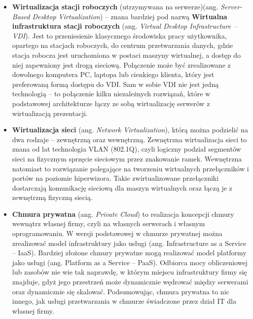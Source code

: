 \begin{itemize}
	\item \textbf{Wirtualizacja stacji roboczych} (utrzymywana na serwerze)(ang. \textit{Server-Based Desktop Virtualization}) – znana bardziej pod nazwą \textbf{Wirtualna infrastruktura stacji roboczych} (ang. \textit{Virtual Desktop Infrastructure – VDI}). Jest to przeniesienie klasycznego środowiska pracy użytkownika, opartego na stacjach roboczych, do centrum przetwarzania danych, gdzie stacja robocza jest uruchomiona w postaci maszyny wirtualnej, a dostęp do niej zapewniony jest drogą sieciową. Połączenie może być zrealizowane z dowolnego komputera PC, laptopa lub cienkiego klienta, który jest preferowaną formą dostępu do VDI. Sam w sobie VDI nie jest jedną technologią – to połączenie kilku niezależnych rozwiązań, które w podstawowej architekturze łączy ze sobą wirtualizację serwerów z wirtualizacją prezentacji.
	\item \textbf{Wirtualizacja sieci} (ang. \textit{Network Virtualization}), którą można podzielić na dwa rodzaje – zewnętrzną oraz wewnętrzną. Zewnętrzna wirtualizacja sieci to znana od lat technologia VLAN (802.1Q), czyli logiczny podział segmentów sieci na fizycznym sprzęcie sieciowym przez znakowanie ramek. Wewnętrzna natomiast to rozwiązanie polegające na tworzeniu wirtualnych przełączników i portów na poziomie hiperwizora. Takie zwirtualizowane przełączniki dostarczają komunikację sieciową dla maszyn wirtualnych oraz łączą je z zewnętrzną fizyczną siecią.
	\item \textbf{Chmura prywatna} (ang. \textit{Private Cloud}) to realizacja koncepcji chmury wewnątrz własnej firmy, czyli na własnych serwerach i własnym oprogramowaniu. W wersji podstawowej w chmurze prywatnej można zrealizować model infrastruktury jako usługi (ang. Infrastructure as a Service  – IaaS). Bardziej złożone chmury prywatne mogą realizować model platformy jako usługi (ang. Platform as a Service – PaaS). Odbiorca mocy obliczeniowej lub zasobów nie wie tak naprawdę, w którym miejscu infrastruktury firmy się znajduje, gdyż jego przestrzeń może dynamicznie wędrować między serwerami oraz dynamicznie się skalować. Podsumowując, chmura prywatna to nic innego, jak usługi przetwarzania w chmurze świadczone przez dział IT dla własnej firmy.
\end{itemize}

